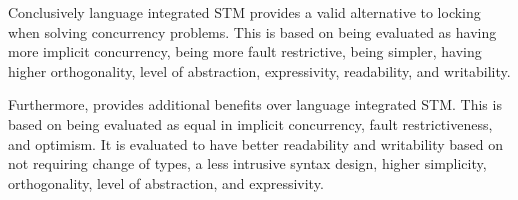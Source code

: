 
Conclusively language integrated \ac{STM} provides a valid alternative to locking when solving concurrency problems. This is based on being evaluated as having more implicit concurrency, being more fault restrictive, being simpler, having higher orthogonality, level of abstraction, expressivity, readability, and writability.

Furthermore, \stmname provides additional benefits over language integrated \ac{STM}. This is based on being evaluated as equal in implicit concurrency, fault restrictiveness, and optimism. It is evaluated to have better readability and writability based on not requiring change of types, a less intrusive syntax design, higher simplicity, orthogonality, level of abstraction, and expressivity.

\worksheetend